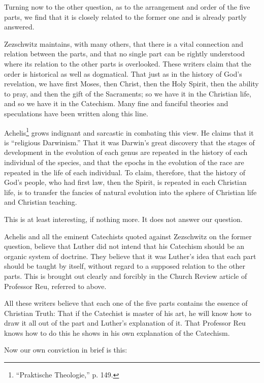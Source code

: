 Turning now to the other question, as to the arrangement and order of the five parts, we find that it is closely related to the former one and is already partly answered.

 Zezschwitz maintains, with many others, that there is a vital connection and relation between the parts, and that no single part can be rightly understood where its relation to the other parts is overlooked. These writers claim that the order is historical as well as dogmatical. That just as in the history of God’s revelation, we have first Moses, then Christ, then the Holy Spirit, then the ability to pray, and then the gift of the Sacraments; so we have it in the Christian life, and so we have it in the Catechism. Many fine and fanciful theories and speculations have been written along this line.

Achelis\footnote{“Praktische Theologie,” p. 149.} grows indignant and sarcastic in combating this view. He claims that it is “religious Darwinism.” That it was Darwin’s great discovery that the stages of development in the evolution of each genus are repeated in the history of each individual of the species, and that the epochs in the evolution of the race are repeated in the life of each individual. To claim, therefore, that the history of God’s people, who had first law, then the Spirit, is repeated in each Christian life, is to transfer the fancies of natural evolution into the sphere of Christian life and Christian teaching.

This is at least interesting, if nothing more. It does not answer our question.

 Achelis and all the eminent Catechists quoted against Zezschwitz on the former question, believe that Luther did not intend that his Catechism should be an organic system of doctrine. They believe that it was Luther’s idea that each part should be taught by itself, without regard to a supposed relation to the other parts. This is brought out clearly and forcibly in the Church Review article of Professor Reu, referred to above.

All these writers believe that each one of the five parts contains the essence of Christian Truth: That if the Catechist is master of his art, he will know how to draw it all out of the part and Luther’s explanation
of it. That Professor Reu knows how to do this he shows in his own explanation of the Catechism.

Now our own conviction in brief is this:


